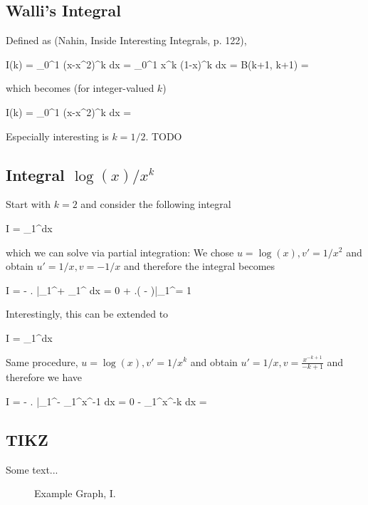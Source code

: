 \subsection{Walli's Integral}

Defined as (Nahin, Inside Interesting Integrals, p. 122),

\bee
I(k) = \int_0^1 (x-x^2)^k dx = \int_0^1 x^k (1-x)^k dx = B(k+1, k+1) = 
\eee

which becomes (for integer-valued $k$)

\bee
I(k) = \int_0^1 (x-x^2)^k dx = 
\eee

Especially interesting is $k =1/2$. TODO


\subsection{Integral $\log(x)/x^k$}

Start with $k = 2$ and consider the following integral

\bee
I = \int_1^\infty {}dx
\eee

which we can solve via partial integration: We chose $u=\log(x), v'=1/x^2$ and obtain $u' = 1/x, v = -1/x$ and therefore the integral becomes

\bee
I = - \left.  \right|_1^\infty + \int_1^\infty {} dx = 0 + \left.\left( -  \right)\right|_1^\infty = 1
\eee

Interestingly, this can be extended to

\bee
I = \int_1^\infty {}dx
\eee

Same procedure, $u=\log(x), v'=1/x^k$ and obtain $u' = 1/x, v = \frac{x^{-k+1}}{-k+1}$ and therefore we have

\bee
I = - \left.  \right|_1^\infty - \int_1^\infty x^{-1}  dx = 0 -  \int_1^\infty x^{-k} dx = 
\eee


\subsection{TIKZ}

Some text...

\begin{figure}[H]
\centering
{}
\caption{Example Graph, I.}
\end{figure}



